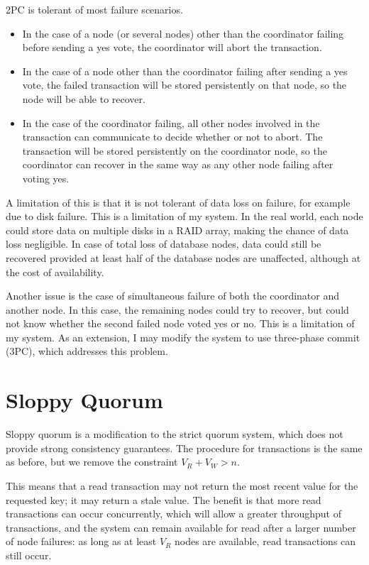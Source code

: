 \documentclass[12pt,a4paper,twoside,openright]{report}
\begin{document}
2PC is tolerant of most failure scenarios.

\begin{itemize}
\item
In the case of a node (or several nodes) other than the coordinator failing before sending a yes vote, the coordinator will abort the transaction.

\item
In the case of a node other than the coordinator failing after sending a yes vote, the failed transaction will be stored persistently on that node, so the node will be able to recover.

\item
In the case of the coordinator failing, all other nodes involved in the transaction can communicate to decide whether or not to abort. The transaction will be stored persistently on the coordinator node, so the coordinator can recover in the same way as any other node failing after voting yes.

\end{itemize}

A limitation of this is that it is not tolerant of data loss on failure, for example due to disk failure. This is a limitation of my system. In the real world, each node could store data on multiple disks in a RAID array, making the chance of data loss negligible. In case of total loss of database nodes, data could still be recovered provided at least half of the database nodes are unaffected, although at the cost of availability.

Another issue is the case of simultaneous failure of both the coordinator and another node. In this case, the remaining nodes could try to recover, but could not know whether the second failed node voted yes or no. This is a limitation of my system. As an extension, I may modify the system to use three-phase commit (3PC), which addresses this problem.

\section{Sloppy Quorum}

Sloppy quorum is a modification to the strict quorum system, which does not provide strong consistency guarantees. The procedure for transactions is the same as before, but we remove the constraint $V_R + V_W > n$.

This means that a read transaction may not return the most recent value for the requested key; it may return a stale value. The benefit is that more read transactions can occur concurrently, which will allow a greater throughput of transactions, and the system can remain available for read after a larger number of node failures: as long as at least $V_R$ nodes are available, read transactions can still occur.
\end{document}

